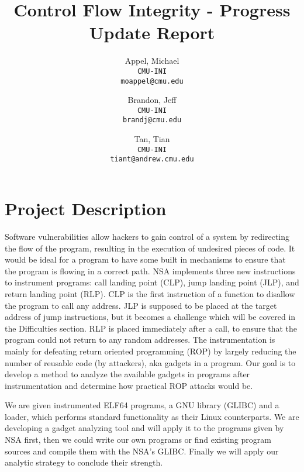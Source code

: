 \documentclass[letterpaper,10pt]{article}
\begin{document}
\title{Control Flow Integrity - Progress Update Report}
\author{
  Appel, Michael\\
  \texttt{CMU-INI} \\
  \texttt{moappel@cmu.edu}
  \and
  Brandon, Jeff\\
  \texttt{CMU-INI} \\
  \texttt{brandj@cmu.edu} 
  \and
  Tan, Tian \\
  \texttt{CMU-INI} \\
  \texttt{tiant@andrew.cmu.edu}
}
\maketitle
\section{Project Description}
Software vulnerabilities allow hackers to gain control of a system by redirecting the flow of the program, resulting in the execution of undesired pieces of code. It would be ideal for a program to have some built in mechanisms to ensure that the program is flowing in a correct path. NSA implements three new instructions to instrument programs: call landing point (CLP), jump landing point (JLP), and return landing point (RLP). CLP is the first instruction of a function to disallow the program to call any address. JLP is supposed to be placed at the target address of jump instructions, but it becomes a challenge which will be covered in the Difficulties section. RLP is placed immediately after a call, to ensure that the program could not return to any random addresses. The instrumentation is mainly for defeating return oriented programming (ROP) by largely reducing the number of reusable code (by attackers), aka gadgets in a program. Our goal is to develop a method to analyze the available gadgets in programs after instrumentation and determine how practical ROP attacks would be.

We are given instrumented ELF64 programs, a GNU library (GLIBC) and a loader, which performs standard functionality as their Linux counterparts. We are developing a gadget analyzing tool and will apply it to the programs given by NSA first, then we could write our own programs or find existing program sources and compile them with the NSA's GLIBC. Finally we will apply our analytic strategy to conclude their strength.
\end{document}
